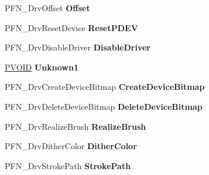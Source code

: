 \begin{DoxyCompactItemize}
P\+F\+N\+\_\+\+Drv\+Offset {\bfseries Offset}
\item 
\mbox{\label{struct___d_r_i_v_e_r___f_u_n_c_t_i_o_n_s_a0f1ee5b0e590794deb8d77dd65682399}} 
P\+F\+N\+\_\+\+Drv\+Reset\+Device {\bfseries Reset\+P\+D\+EV}
\item 
\mbox{\label{struct___d_r_i_v_e_r___f_u_n_c_t_i_o_n_s_a02bebf2fb59287b05ee6029b03ff3b49}} 
P\+F\+N\+\_\+\+Drv\+Disable\+Driver {\bfseries Disable\+Driver}
\item 
\mbox{\label{struct___d_r_i_v_e_r___f_u_n_c_t_i_o_n_s_a10dc98da7435786638e5290301fb1eb4}} 
\hyperlink{interfacevoid}{P\+V\+O\+ID} {\bfseries Unknown1}
\item 
\mbox{\label{struct___d_r_i_v_e_r___f_u_n_c_t_i_o_n_s_a449e1dee6d05a9a1641b8ca2c482c6d2}} 
P\+F\+N\+\_\+\+Drv\+Create\+Device\+Bitmap {\bfseries Create\+Device\+Bitmap}
\item 
\mbox{\label{struct___d_r_i_v_e_r___f_u_n_c_t_i_o_n_s_afd3a750c5f581545d3746c6430f48b5f}} 
P\+F\+N\+\_\+\+Drv\+Delete\+Device\+Bitmap {\bfseries Delete\+Device\+Bitmap}
\item 
\mbox{\label{struct___d_r_i_v_e_r___f_u_n_c_t_i_o_n_s_acc7df5cbdc9e282075eeecef3482bae6}} 
P\+F\+N\+\_\+\+Drv\+Realize\+Brush {\bfseries Realize\+Brush}
\item 
\mbox{\label{struct___d_r_i_v_e_r___f_u_n_c_t_i_o_n_s_ac45128b70fbf88661a43c1422209030d}} 
P\+F\+N\+\_\+\+Drv\+Dither\+Color {\bfseries Dither\+Color}
\item 
\mbox{\label{struct___d_r_i_v_e_r___f_u_n_c_t_i_o_n_s_a60159dcf75e09734d90fe6c75cac3bed}} 
P\+F\+N\+\_\+\+Drv\+Stroke\+Path {\bfseries Stroke\+Path}
\item 
\mbox{\label{struct___d_r_i_v_e_r___f_u_n_c_t_i_o_n_s_a7eb3d715677b94f0b8972c6c494452a9}} 

\end{DoxyCompactItemize}
